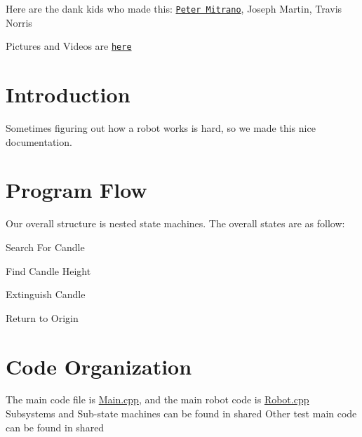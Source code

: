 Here are the dank kids who made this\-:  \href{https://petermitrano.github.io}{\tt Peter Mitrano},  Joseph Martin,  Travis Norris

Pictures and Videos are \href{https://photos.google.com/album/AF1QipMH7TU09SdCnFJVnUSU03R5djZ0XUy_WJTzKOHU}{\tt here}\hypertarget{index_Introduction}{}\section{Introduction}\label{index_Introduction}
Sometimes figuring out how a robot works is hard, so we made this nice documentation.\hypertarget{index_Flow}{}\section{Program Flow}\label{index_Flow}
Our overall structure is nested state machines. The overall states are as follow\-:


\begin{DoxyItemize}
\item Search For Candle
\item Find Candle Height
\item Extinguish Candle
\item Return to Origin
\end{DoxyItemize}\hypertarget{index_Organiztion}{}\section{Code Organization}\label{index_Organiztion}
The main code file is \hyperlink{Main_8cpp}{Main.\-cpp}, and the main robot code is \hyperlink{Robot_8cpp}{Robot.\-cpp} Subsystems and Sub-\/state machines can be found in shared Other test main code can be found in shared 